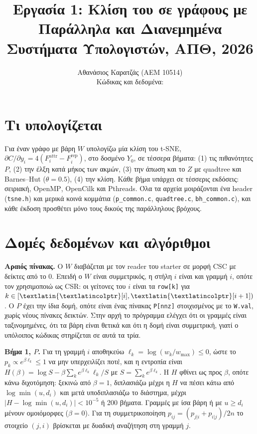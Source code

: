 \documentclass[10pt,a4paper]{article}
\title{\vspace{-1.2cm}\Large\textbf{Εργασία 1: Κλίση του \en{t-SNE} σε γράφους με \en{Barnes--Hut}}\\[2pt]
\large Παράλληλα και Διανεμημένα Συστήματα Υπολογιστών, ΑΠΘ, 2026}
\author{Αθανάσιος Καρατζάς (ΑΕΜ 10514)\\
\small Κώδικας και δεδομένα: \en{\url{https://github.com/thkaratzas/graph-t-sne-Karatzas}}}
\date{\vspace{-0.6cm}}
\newcommand{\en}[1]{\textlatin{#1}}
\let\origtexttt\texttt
\renewcommand{\texttt}[1]{\textlatin{\origtexttt{#1}}}
\begin{document}
\maketitle

\section{Τι υπολογίζεται}

Για έναν γράφο με βάρη $W$ υπολογίζω μία κλίση του \en{t-SNE},
$\partial C/\partial y_i = 4(F^{\mathrm{attr}}_i - F^{\mathrm{rep}}_i)$, στο δοσμένο $Y_0$,
σε τέσσερα βήματα: (1) τις πιθανότητες $P$, (2) την έλξη κατά μήκος των ακμών,
(3) την άπωση και το $Z$ με \en{quadtree} και \en{Barnes--Hut} ($\theta=0.5$),
(4) την κλίση. Κάθε βήμα υπάρχει σε τέσσερις εκδόσεις: σειριακή, \en{OpenMP}, \en{OpenCilk} και
\en{Pthreads}. Όλα τα αρχεία μοιράζονται ένα \en{header} (\texttt{tsne.h}) και μερικά κοινά κομμάτια
(\texttt{p\_common.c}, \texttt{quadtree.c}, \texttt{bh\_common.c}), και κάθε έκδοση προσθέτει μόνο
τους δικούς της παράλληλους βρόχους.

\section{Δομές δεδομένων και αλγόριθμοι}

\textbf{Αραιός πίνακας.} Ο $W$ διαβάζεται με τον \en{reader} του \en{starter} σε μορφή \en{CSC} με
δείκτες από το 0. Επειδή ο $W$ είναι συμμετρικός, η στήλη $i$ είναι και γραμμή $i$, οπότε τον
χρησιμοποιώ ως \en{CSR}: οι γείτονες του $i$ είναι τα \texttt{row[k]} για
$k\in[\texttt{colptr}[i],\texttt{colptr}[i+1])$. Ο $P$ έχει την ίδια δομή, οπότε είναι ένας πίνακας
\texttt{P[nnz]} στοιχισμένος με το \texttt{W.val}, χωρίς νέους πίνακες δεικτών. Στην αρχή το πρόγραμμα
ελέγχει ότι οι γραμμές είναι ταξινομημένες, ότι τα βάρη είναι θετικά και ότι η δομή είναι
συμμετρική, γιατί ο υπόλοιπος κώδικας στηρίζεται σε αυτά τα τρία.

\textbf{Βήμα 1, $P$.} Για τη γραμμή $i$ αποθηκεύω $\ell_k=\log(w_k/w_{\max})\le 0$, ώστε το
$p_k\propto e^{\beta\ell_k}\le 1$ να μην υπερχειλίζει ποτέ, και η εντροπία είναι
$H(\beta)=\log S-\beta\sum_k e^{\beta\ell_k}\ell_k/S$ με $S=\sum_k e^{\beta\ell_k}$.
Η $H$ φθίνει ως προς $\beta$, οπότε κάνω διχοτόμηση: ξεκινώ από $\beta=1$, διπλασιάζω μέχρι η $H$
να πέσει κάτω από $\log\min(u,d_i)$ και μετά υποδιπλασιάζω το διάστημα, μέχρι
$|H-\log\min(u,d_i)|<10^{-5}$ ή 200 βήματα. Γραμμές με ίσα βάρη ή με $u\ge d_i$ μένουν ομοιόμορφες
($\beta=0$). Για τη συμμετρικοποίηση $p_{ij}=(p_{j|i}+p_{i|j})/2n$ το στοιχείο $(j,i)$ βρίσκεται με
δυαδική αναζήτηση στη γραμμή $j$.
\end{document}
